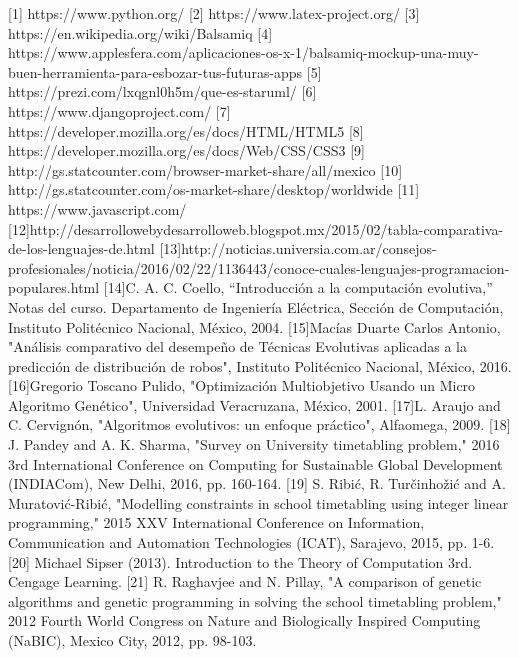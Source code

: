 \label{sec:bibliografia}

	[1] https://www.python.org/
	[2] https://www.latex-project.org/
	[3] https://en.wikipedia.org/wiki/Balsamiq 
	[4] https://www.applesfera.com/aplicaciones-os-x-1/balsamiq-mockup-una-muy-buen-herramienta-para-esbozar-tus-futuras-apps
	[5] https://prezi.com/lxqgnl0h5m/que-es-staruml/
	[6] https://www.djangoproject.com/
	[7] https://developer.mozilla.org/es/docs/HTML/HTML5
	[8] https://developer.mozilla.org/es/docs/Web/CSS/CSS3
	[9] http://gs.statcounter.com/browser-market-share/all/mexico
	[10] http://gs.statcounter.com/os-market-share/desktop/worldwide
	[11] https://www.javascript.com/
	[12]http://desarrollowebydesarrolloweb.blogspot.mx/2015/02/tabla-comparativa-de-los-lenguajes-de.html
	[13]http://noticias.universia.com.ar/consejos-profesionales/noticia/2016/02/22/1136443/conoce-cuales-lenguajes-programacion-populares.html
	\label{14}[14]C. A. C. Coello, “Introducción a la computación evolutiva,” Notas del curso. Departamento de Ingeniería Eléctrica, Sección de Computación, Instituto Politécnico Nacional, México, 2004.
	\label{15}[15]Macías Duarte Carlos Antonio, "Análisis comparativo del desempeño de Técnicas Evolutivas aplicadas a la predicción de distribución de robos", Instituto Politécnico Nacional, México, 2016.
	\label{16}[16]Gregorio Toscano Pulido, "Optimización Multiobjetivo Usando un Micro Algoritmo Genético", Universidad Veracruzana, México, 2001.
	\label{17}[17]L. Araujo and C. Cervignón, "Algoritmos evolutivos: un enfoque práctico", Alfaomega, 2009.
	\label{18}[18] J. Pandey and A. K. Sharma, "Survey on University timetabling problem," 2016 3rd International Conference on Computing for Sustainable Global Development (INDIACom), New Delhi, 2016, pp. 160-164.
	\label{19}[19] S. Ribić, R. Turčinhožić and A. Muratović-Ribić, "Modelling constraints in school timetabling using integer linear programming," 2015 XXV International Conference on Information, Communication and Automation Technologies (ICAT), Sarajevo, 2015, pp. 1-6.
	\label{20}[20]  Michael Sipser (2013). Introduction to the Theory of Computation 3rd. Cengage Learning.
	\label{21}[21] R. Raghavjee and N. Pillay, "A comparison of genetic algorithms and genetic programming in solving the school timetabling problem," 2012 Fourth World Congress on Nature and Biologically Inspired Computing (NaBIC), Mexico City, 2012, pp. 98-103.	
	
		